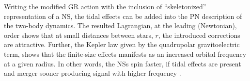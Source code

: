 %
Writing the modified \ac{GR} action with the inclusion of ``skeletonized'' representation
of a \ac{NS}, the tidal effects can be added into the \ac{PN} description of the two-body dynamics.
The resulted Lagrangian, at the leading (Newtonian), order shows that at small distances 
between stars, $r$, the introduced corrections are attractive. 
%
Further, the Kepler law given by the quadrupolar gravitoelectric term, 
%
%
shows that the finite-size effects manifests as an increased orbital frequency at a given radius.
In other words, the \acp{NS} spin faster, if tidal effects are present and merger sooner 
producing signal with higher frequency \cite{Damour:2009wj}. 
%

